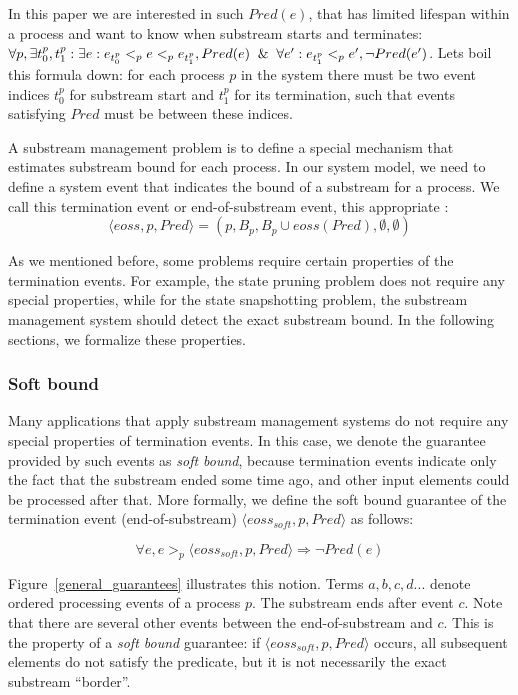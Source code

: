 In this paper we are interested in such $Pred(e)$, that has limited lifespan within a process and want to know when substream starts and terminates: $\forall p, \exists t_0^p, t_1^p: \exists e: e_{t_0^p} <_p e <_p e_{t_1^p}, Pred(e) \And \forall e': e_{t_1^p} <_p e', \neg Pred(e')$. Lets boil this formula down: for each process $p$ in the system there must be two event indices $t_0^p$ for substream start and $t_1^p$ for its termination, such that events satisfying $Pred$ must be between these indices. 

A substream management problem is to define a special mechanism that estimates substream bound for each process. In our system model, we need to define a system event that indicates the bound of a substream for a process. We call this termination event or end-of-substream event, this appropriate :
\begin{equation}
  \langle eoss, p, Pred \rangle = (p, B_p, B_p\cup eoss(Pred), \emptyset, \emptyset)  
\end{equation}

As we mentioned before, some problems require certain properties of the termination events. For example, the state pruning problem does not require any special properties, while for the state snapshotting problem, the substream management system should detect the exact substream bound. In the following sections, we formalize these properties. 

\subsubsection{Soft bound}

Many applications that apply substream management systems do not require any special properties of termination events. In this case, we denote the guarantee provided by such events as {\em soft bound}, because termination events indicate only the fact that the substream ended some time ago, and other input elements could be processed after that. More formally, we define the soft bound guarantee of the termination event (end-of-substream) $\langle eoss_{soft}, p, Pred\rangle$ as follows:

\begin{equation}
\forall e, e >_p \langle eoss_{soft}, p, Pred\rangle \Rightarrow \neg Pred(e)
\end{equation}

Figure~\ref{general_guarantees} illustrates this notion. Terms $a,b,c,d...$ denote ordered processing events of a process $p$. The substream ends after event $c$. Note that there are several other events between the end-of-substream and $c$. This is the property of a {\em soft bound} guarantee: if $\langle eoss_{soft}, p, Pred\rangle$ occurs, all subsequent elements do not satisfy the predicate, but it is not necessarily the exact substream ``border''.

